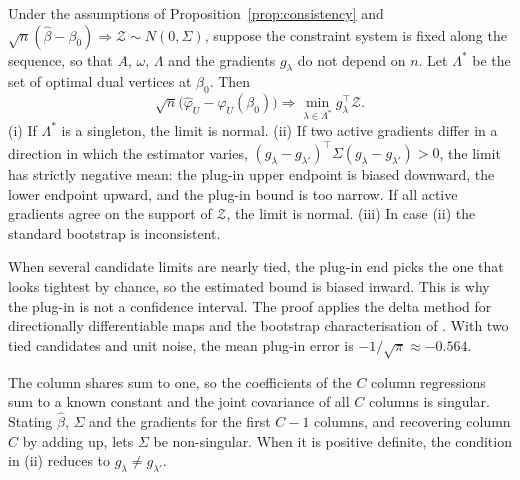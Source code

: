\begin{theorem}\label{thm:limit}
Under the assumptions of Proposition~\ref{prop:consistency} and
$\sqrt n(\hat\beta-\beta_0)\Rightarrow\mathcal Z\sim N(0,\Sigma)$, suppose the
constraint system is fixed along the sequence, so that $A$, $\omega$, $\Lambda$ and
the gradients $g_\lambda$ do not depend on $n$. Let $\Lambda^*$ be the set of optimal
dual vertices at $\beta_0$. Then
\[
\sqrt n\big(\hat\varphi_U-\varphi_U(\beta_0)\big)\Rightarrow\min_{\lambda\in\Lambda^*}g_\lambda^\top\mathcal Z .
\]
(i) If $\Lambda^*$ is a singleton, the limit is normal. (ii) If two active
gradients differ in a direction in which the estimator varies,
$(g_\lambda-g_{\lambda'})^\top\Sigma(g_\lambda-g_{\lambda'})>0$, the limit has
strictly negative mean: the plug-in upper endpoint is biased downward, the lower
endpoint upward, and the plug-in bound is too narrow. If all active gradients
agree on the support of $\mathcal Z$, the limit is normal. (iii) In case (ii) the
standard bootstrap is inconsistent.
\end{theorem}
\begin{reading}
When several candidate limits are nearly tied, the plug-in end picks the one that
looks tightest by chance, so the estimated bound is biased inward. This is why the
plug-in is not a confidence interval. The proof applies the delta method for
directionally differentiable maps \citep{shapiro1991,fangsantos2019} and the
bootstrap characterisation of \citet{fangsantos2019}. With two tied candidates and
unit noise, the mean plug-in error is $-1/\sqrt\pi\approx-0.564$.
\end{reading}

\begin{remark}\label{rem:Cminus1}
The column shares sum to one, so the coefficients of the $C$ column regressions
sum to a known constant and the joint covariance of all $C$ columns is singular.
Stating $\hat\beta$, $\Sigma$ and the gradients for the first $C-1$ columns, and
recovering column $C$ by adding up, lets $\Sigma$ be non-singular. When it is
positive definite, the condition in (ii) reduces to $g_\lambda\ne g_{\lambda'}$.
\end{remark}

